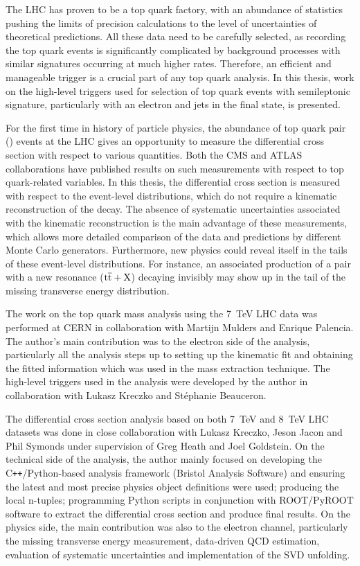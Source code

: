 The LHC has proven to be a top quark factory, with an abundance of statistics pushing the limits of precision
calculations to the level of uncertainties of theoretical predictions. All these data need to be carefully selected, as
recording the top quark events is significantly complicated by background processes with similar signatures occurring at
much higher rates. Therefore, an efficient and manageable trigger is a crucial part of any top quark analysis. In this
thesis, work on the high-level triggers used for selection of top quark events with semileptonic signature, particularly
with an electron and jets in the final state, is presented.

For the first time in history of particle physics, the abundance of top quark pair (\ttbar) events at the LHC gives an
opportunity to measure the \ttbar differential cross section with respect to various quantities. Both the CMS and ATLAS
collaborations have published results on such measurements with respect to top quark-related variables. In this thesis,
the \ttbar differential cross section is measured with respect to the event-level distributions, which do not require a
kinematic reconstruction of the \ttbar decay. The absence of systematic uncertainties associated with the kinematic
reconstruction is the main advantage of these measurements, which allows more detailed comparison of the data and
predictions by different Monte Carlo generators. Furthermore, new physics could reveal itself in the tails of these
event-level distributions. For instance, an associated production of a \ttbar pair with a new resonance
($\mathrm{t}\overline{\mathrm{t}}+\mathrm{X}$) decaying invisibly may show up in the tail of the missing transverse energy distribution.

The work on the top quark mass analysis using the \SI{7}{\TeV} LHC data was performed at CERN in collaboration with
Martijn Mulders and Enrique Palencia. The author's main contribution was to the electron side of the analysis,
particularly all the analysis steps up to setting up the kinematic fit and obtaining the fitted information which was
used in the mass extraction technique. The high-level triggers used in the analysis were developed by the author in
collaboration with Lukasz Kreczko and St\'{e}phanie Beauceron.

The differential cross section analysis based on both \SI{7}{\TeV} and \SI{8}{\TeV} LHC datasets was done in close
collaboration with Lukasz Kreczko, Jeson Jacon and Phil Symonds under supervision of Greg Heath and Joel Goldstein. On
the technical side of the analysis, the author mainly focused on developing the C\texttt{++}/Python-based analysis
framework (Bristol Analysis Software) and ensuring the latest and most precise physics object definitions were used;
producing the local n-tuples; programming Python scripts in conjunction with ROOT/PyROOT software to extract the
differential cross section and produce final results. On the physics side, the main contribution was also to the
electron channel, particularly the missing transverse energy measurement, data-driven QCD estimation, evaluation of
systematic uncertainties and implementation of the SVD unfolding.

